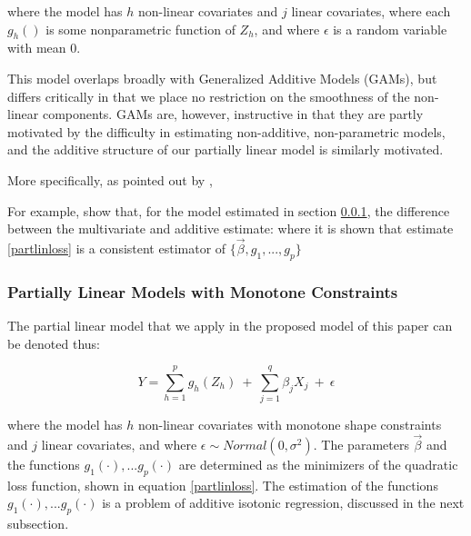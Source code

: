 \documentclass[10pt]{olplainarticle}\usepackage[]{graphicx}\usepackage[]{color}
\begin{document}
where the model has $h$ non-linear covariates and $j$ linear covariates, where each $g_{h}()$ is some nonparametric function of $Z_{h}$, and where $\epsilon$ is a random variable with mean $0$.

This model overlaps broadly with Generalized Additive Models (GAMs), but differs critically in that we place no restriction on the smoothness of the non-linear components. GAMs are, however, instructive in that they are partly motivated by the difficulty in estimating non-additive, non-parametric models, and the additive structure of our partially linear model is similarly motivated.

More specifically, as pointed out by \cite{hastiegam}, 

For example, \cite{guangcheng} show that, for the model estimated in section \ref{plmmc}, the difference between the multivariate and additive estimate: 
where it is shown that estimate \ref{partlinloss} is a consistent estimator of $\{\vec{\beta}, g_1,...,g_p\}$ 

% 
% 


\subsubsection{Partially Linear Models with Monotone Constraints} \label{plmmc}

The partial linear model that we apply in the proposed model of this paper can be denoted thus:


\begin{equation} \label{partlinmono}
  Y = \sum_{h=1}^{p} g_{h} (Z_{h}) \ +\  \sum_{j=1}^{q} \beta_{j} X_{j} \ +\ \epsilon
\end{equation}


where the model has $h$ non-linear covariates with monotone shape constraints and $j$ linear covariates, and where $\epsilon \sim Normal(0, \sigma^2)$. The parameters $\vec{\beta}$ and the functions $g_1(\cdot),...g_p(\cdot)$ are determined as the minimizers of the quadratic loss function, shown in equation \ref{partlinloss}. The estimation of the functions $g_1(\cdot),...g_p(\cdot)$ is a problem of additive isotonic regression, discussed in the next subsection.
\end{document}
